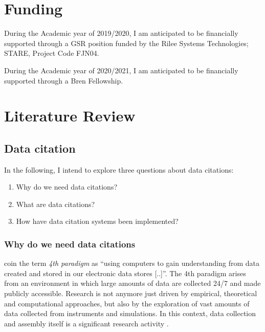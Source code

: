 \documentclass[letterpaper, parskip=half]{scrartcl}
\begin{document}
\section{Funding}
During the Academic year of 2019/2020, I am anticipated to be financially supported through a GSR position funded by the Rilee Systems Technologies; STARE, Project Code FJN04.

During the Academic year of 2020/2021, I am anticipated to be financially supported through a Bren Fellowship.




\newpage
\section{Literature Review}

\subsection{Data citation}
In the following, I intend to explore three questions about data citations:

\begin{enumerate}
 \item Why do we need data citations?
 \item What are data citations?
 \item How have data citation systems been implemented?
\end{enumerate}

\subsubsection{Why do we need data citations}    
\cite{Hey2009} coin the term \textit{4th paradigm} as ``using computers to gain understanding from data created and stored in our electronic data stores [..]''.
The 4th paradigm arises from an environment in which large amounts of data are collected 24/7 and made publicly accessible. Research is not anymore just driven by empirical, theoretical and computational approaches, but also by the exploration of vast amounts of data collected from instruments and simulations. In this context, data collection and assembly itself is a significant research activity \citep{Frew2012}.
\end{document}
